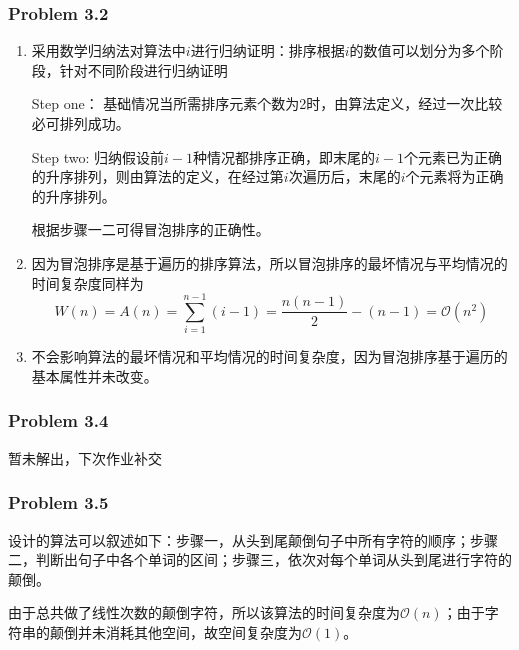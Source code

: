 \documentclass[UTF8,12pt]{article} %
\makeatletter
\theoremstyle{definition}
\newenvironment{proof}[1][\protect\proofname]{\par
\normalfont\topsep6\p@\@plus6\p@\relax
\trivlist
\itemindent\parindent
\item[\hskip\labelsep
\scshape
#1]\ignorespaces
}{%
\endtrivlist\@endpefalse
}
\renewcommand{\proofname}{\it{\textbf{证明}}}
\makeatother
\begin{document}
\subsubsection*{Problem 3.2}
\begin{proof}[\textbf{解答}]
\begin{enumerate}[1)]
	\item 采用数学归纳法对算法中$i$进行归纳证明：排序根据$i$的数值可以划分为多个阶段，针对不同阶段进行归纳证明

	Step one：
	基础情况当所需排序元素个数为2时，由算法定义，经过一次比较必可排列成功。

	Step two:
	归纳假设前$i-1$种情况都排序正确，即末尾的$i-1$个元素已为正确的升序排列，则由算法的定义，在经过第$i$次遍历后，末尾的$i$个元素将为正确的升序排列。

	根据步骤一二可得冒泡排序的正确性。
	\item 因为冒泡排序是基于遍历的排序算法，所以冒泡排序的最坏情况与平均情况的时间复杂度同样为\[W(n)=A(n)=\sum^{n-1}_{i=1} (i-1)=\frac{n(n-1)}{2}-(n-1)=\mathcal{O}(n^{2})\]

	\item 不会影响算法的最坏情况和平均情况的时间复杂度，因为冒泡排序基于遍历的基本属性并未改变。
\end{enumerate}
\end{proof}


\subsubsection*{Problem 3.4}
\begin{proof}
暂未解出，下次作业补交
\end{proof}


\subsubsection*{Problem 3.5}
\begin{proof}[\textbf{解答}]
	设计的算法可以叙述如下：步骤一，从头到尾颠倒句子中所有字符的顺序；步骤二，判断出句子中各个单词的区间；步骤三，依次对每个单词从头到尾进行字符的颠倒。

	由于总共做了线性次数的颠倒字符，所以该算法的时间复杂度为$\mathcal{O}(n)$；由于字符串的颠倒并未消耗其他空间，故空间复杂度为$\mathcal{O}(1)$。
\end{proof}
\end{document}
